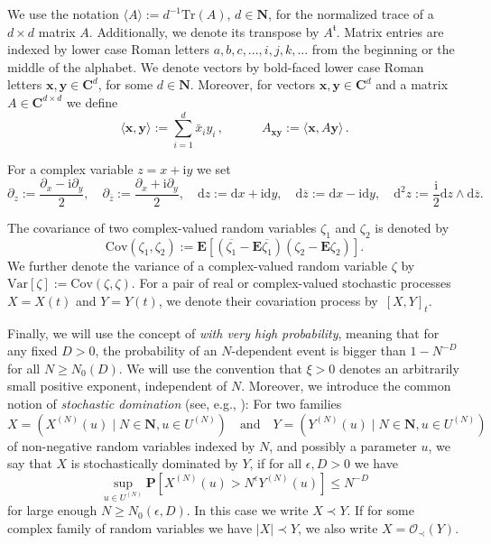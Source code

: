 \documentclass[10pt]{amsart}
\numberwithin{equation}{section}
\newcommand{\dif}{\mathrm{d}}
\newcommand{\E}{\mathbf{E}}
\newcommand{\C}{\mathbf{C}}
\newcommand{\N}{\mathbf{N}}
\newcommand{\Cov}{\mathrm{Cov}}
\newcommand{\Var}{\mathrm{Var}}
\newcommand{\ii}{\mathrm{i}}
\newcommand{\mt}{\mathfrak{t}}
\begin{document}
We use the notation $\langle A \rangle := d^{-1} \mathrm{Tr}(A)$, $d \in \N$, for the normalized trace of a $d \times d$ matrix $A$. Additionally, we denote its transpose by $A^\mt$. Matrix entries are indexed by lower case Roman letters $a, b, c , ... ,i,j,k,... $ from the beginning or the middle of the alphabet. We denote vectors by bold-faced lower case Roman letters $\boldsymbol{x}, \boldsymbol{y} \in \C^{d}$, for some $d \in \N$. Moreover, for vectors $\boldsymbol{x}, \boldsymbol{y} \in \C^{d}$ and a matrix $A\in\C^{d\times d}$ we define
 \begin{equation*}
	\langle \boldsymbol{x}, \boldsymbol{y} \rangle := \sum_{i=1}^d \bar{x}_i y_i\,, 
	\qquad\quad A_{\boldsymbol{x} \boldsymbol{y}} := \langle \boldsymbol{x}, A \boldsymbol{y} \rangle\,. 
\end{equation*}

For a complex variable $z=x+\ii y$ we set
\begin{equation*}
\partial_z:=\frac{\partial_x-\ii\partial_y}{2},\quad \partial_{\overline{z}}:=\frac{\partial_x+\ii\partial_y}{2},\quad \dif z:=\dif x+\ii\dif y,\quad \dif\overline{z}:=\dif x-\ii\dif y,\quad \dif^2 z:=\frac{\ii}{2}\dif z\wedge\dif \overline{z}.
\end{equation*}  

The covariance of two complex-valued random variables $\zeta_1$ and $\zeta_2$ is denoted by
\begin{equation*}
\Cov(\zeta_1,\zeta_2):=\E\left[ (\overline{\zeta_1}-\E\overline{\zeta_1})(\zeta_2-\E\zeta_2)\right].
\end{equation*} 
We further denote the variance of a complex-valued random variable $\zeta$ by $\Var[\zeta]:=\Cov(\zeta,\zeta)$. For a pair of real or complex-valued stochastic processes $X=X(t)$ and $Y=Y(t)$, we denote their covariation process by~$[X,Y]_t$.

Finally, we will use the concept  of \emph{with very high probability},  meaning that for any fixed $D > 0$, the probability of an $N$-dependent event is bigger than $1 - N^{-D}$ for all $N \ge N_0(D)$. We will use the convention that $\xi > 0$ denotes an arbitrarily small positive exponent, independent of $N$. Moreover, we introduce the common notion of \emph{stochastic domination} (see, e.g., \cite{loc_sc_gen}): For two families
\begin{equation*}
	X = \left(X^{(N)}(u) \mid N \in \N, u \in U^{(N)}\right) \quad \text{and} \quad Y = \left(Y^{(N)}(u) \mid N \in \N, u \in U^{(N)}\right)
\end{equation*}
of non-negative random variables indexed by $N$, and possibly a parameter $u$, we say that $X$ is stochastically dominated by $Y$, if for all $\epsilon, D >0$ we have 
\begin{equation*}
	\sup_{u \in U^{(N)}} \mathbf{P} \left[X^{(N)}(u) > N^\epsilon Y^{(N)}(u)\right] \le N^{-D}
\end{equation*}
for large enough $N \ge N_0(\epsilon, D)$. In this case we write $X \prec Y$. If for some complex family of random variables we have $\vert X \vert \prec Y$, we also write $X = \mathcal{O}_\prec(Y)$.
\end{document}
